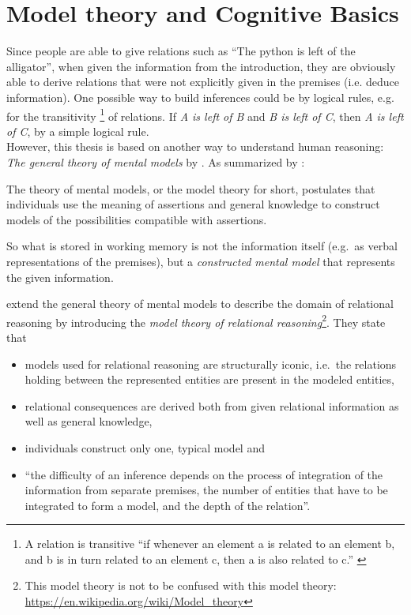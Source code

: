 \documentclass[hidelinks]{scrartcl}
\begin{document}
\section{Model theory and Cognitive Basics}
Since people are able to give relations such as ``The python is left of the alligator'', when given the information from the introduction, they are obviously able to derive relations that were not explicitly given in the \gls{premise}s (i.e. deduce information). One possible way to build inferences could be by logical rules, e.g. for the transitivity \footnote{A relation is transitive ``if whenever an element a is related to an element b, and b is in turn related to an element c, then a is also related to c.'' \citep{Wikipedia.Transitive}} of relations. If \textit{A is left of B} and \textit{B is left of C}, then \textit{A is left of C}, by a simple logical rule. \\
However, this thesis is based on another way to understand human reasoning: \textit{The general theory of \gls{mental model}s} by \cite{Johnson-Laird.1986}. As summarized by \cite*{Jahn.2007}:

\begin{displayquote}
The theory of \gls{mental model}s, or the model theory for short, postulates that individuals use the meaning of assertions and general knowledge to construct models of the possibilities compatible with assertions.
\end{displayquote}

So what is stored in \gls{working memory} is not the information itself (e.g.\ as verbal representations of the \gls{premise}s), but a \textit{constructed \gls{mental model}} that represents the given information.

\cite{Goodwin.2005} extend the general theory of \gls{mental model}s to describe the domain of relational reasoning by introducing the \textit{model theory of relational reasoning}\footnote{This model theory is not to be confused with this model theory: \url{https://en.wikipedia.org/wiki/Model_theory}}. They state that
\begin{itemize}
\item models used for relational reasoning are structurally iconic, i.e.\ the relations holding between the represented entities are present in the modeled entities,
\item relational consequences are derived both from given relational information as well as general knowledge,
\item individuals construct only one, typical model and
\item ``the difficulty of an inference depends on the process of integration of the information from separate \gls{premise}s, the number of entities that have to be integrated to form a model, and the depth of the relation''.
\end{itemize}
\end{document}
